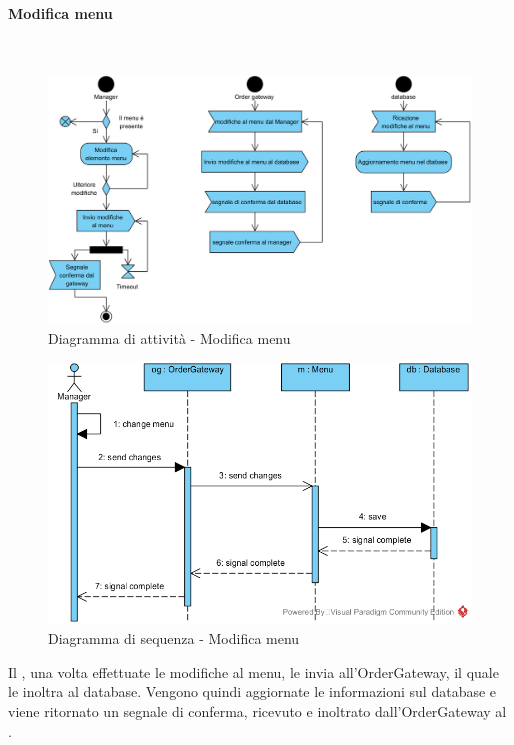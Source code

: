 \begin{samepage}
\paragraph{Modifica menu}\mbox{}\\
\begin{figure}[H]
	\centering
	\includegraphics[width=14cm]{diagrammi_img/attivita/manager_menu_modifiche.png}
	\caption{Diagramma di attività - Modifica menu}
\end{figure}
\end{samepage}
\begin{figure}[H]
	\centering
	\includegraphics[width=14cm]{../../documenti/SpecificaTecnica/diagrammi_img/sequenza/direttore_modifica_menu.png}
	\caption{Diagramma di sequenza - Modifica menu}
\end{figure}
Il \Manager{}, una volta effettuate le modifiche al menu, le invia all'Order\-Gateway, il quale le inoltra al database. Vengono quindi aggiornate le informazioni sul database e viene ritornato un segnale di conferma, ricevuto e inoltrato dall'Order\-Gateway al \Manager{}.


